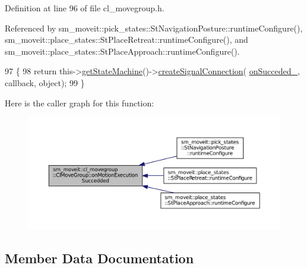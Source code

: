 Definition at line 96 of file cl\+\_\+movegroup.\+h.



Referenced by sm\+\_\+moveit\+::pick\+\_\+states\+::\+St\+Navigation\+Posture\+::runtime\+Configure(), sm\+\_\+moveit\+::place\+\_\+states\+::\+St\+Place\+Retreat\+::runtime\+Configure(), and sm\+\_\+moveit\+::place\+\_\+states\+::\+St\+Place\+Approach\+::runtime\+Configure().


\begin{DoxyCode}
97   \{
98     \textcolor{keywordflow}{return} this->\hyperlink{classsmacc_1_1ISmaccClient_aec51d4712404cb9882b86e4c854bb93a}{getStateMachine}()->\hyperlink{classsmacc_1_1ISmaccStateMachine_adf0f42ade0c65cc471960fe2a7c42da2}{createSignalConnection}(
      \hyperlink{classsm__moveit_1_1cl__movegroup_1_1ClMoveGroup_ad0a02fb564967bae0808c966dd1e3c36}{onSucceded\_}, callback, \textcolor{keywordtype}{object});
99   \}
\end{DoxyCode}


Here is the caller graph for this function\+:
\nopagebreak
\begin{figure}[H]
\begin{center}
\leavevmode
\includegraphics[width=350pt]{classsm__moveit_1_1cl__movegroup_1_1ClMoveGroup_a5359b864e258cb51d0d7ff7ffc615b58_icgraph}
\end{center}
\end{figure}




\subsection{Member Data Documentation}
